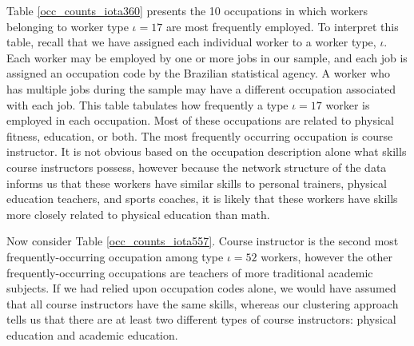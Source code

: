 \documentclass[12pt]{article}
\def\i{\iota}
\theoremstyle{definition}
\theoremstyle{plain}
\begin{document}

Table \ref{occ_counts_iota360} presents the 10 occupations in which workers belonging to worker type $\i=17$ are most frequently employed. To interpret this table, recall that we have assigned each individual worker to a worker type, $\i$. Each worker may be employed by one or more jobs in our sample, and each job is assigned an occupation code by the Brazilian statistical agency. A worker who has multiple jobs during the sample may have a different occupation associated with each job. This table tabulates how frequently a type $\i=17$ worker is employed in each occupation. Most of these occupations are related to physical fitness, education, or both. The most frequently occurring occupation is course instructor.  It is not obvious based on the occupation description alone what skills course instructors possess, however because the network structure of the data informs us that these workers have similar skills to personal trainers, physical education teachers, and sports coaches, it is likely that these workers have skills more closely related to physical education than math. 

Now consider Table \ref{occ_counts_iota557}. Course instructor is the second most frequently-occurring occupation among type $\i=52$ workers, however the other frequently-occurring occupations are teachers of more traditional academic subjects. If we had relied upon occupation codes alone, we would have assumed that all course instructors have the same skills, whereas our clustering approach tells us that there are at least two different types of course instructors: physical education and academic education.
\end{document}
